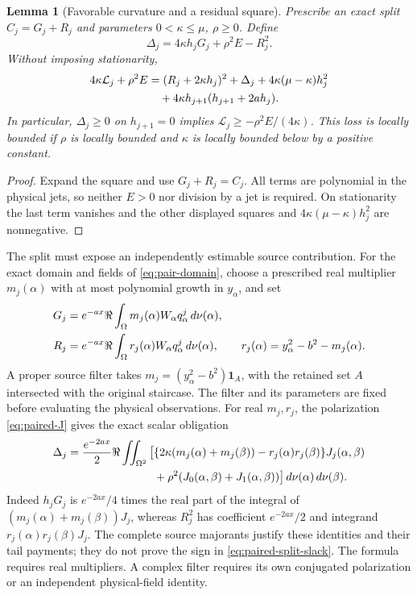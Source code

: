 \documentclass[11pt]{article}
\numberwithin{equation}{section}
\newtheorem{lemma}[theorem]{Lemma}
\theoremstyle{definition}
\theoremstyle{remark}
\newcommand{\dd}{\,d}
\newcommand{\Lag}{\mathcal L}
\begin{document}
\begin{lemma}[Favorable curvature and a residual square]
\label{lem:favorable-split}
Prescribe an exact split $C_j=G_j+R_j$ and parameters
$0<\kappa\le\mu$, $\rho\ge0$. Define
\begin{equation}
 \Delta_j=4\kappa h_jG_j+\rho^2E-R_j^2.
 \label{eq:split-slack}
\end{equation}
Without imposing stationarity,
\begin{align}
 4\kappa\Lag_j+\rho^2E
 &=(R_j+2\kappa h_j)^2+\Delta_j
       +4\kappa(\mu-\kappa)h_j^2 \notag\\
 &\quad+4\kappa h_{j+1}(h_{j+1}+2ah_j).
 \label{eq:split-stationary-ideal}
\end{align}
In particular, $\Delta_j\ge0$ on $h_{j+1}=0$ implies
$\Lag_j\ge-\rho^2E/(4\kappa)$. This loss is locally bounded if
$\rho$ is locally bounded and $\kappa$ is locally bounded below by a
positive constant.
\end{lemma}
\begin{proof}
Expand the square and use $G_j+R_j=C_j$. All terms are polynomial in
the physical jets, so neither $E>0$ nor division by a jet is required.
On stationarity the last term vanishes and the other displayed squares
and $4\kappa(\mu-\kappa)h_j^2$ are nonnegative.
\end{proof}

The split must expose an independently estimable source contribution.
For the exact domain and fields of \eqref{eq:pair-domain}, choose a
prescribed real multiplier $m_j(\alpha)$ with at most polynomial growth
in $y_\alpha$, and set
\begin{align}
 G_j&=e^{-ax}\Re\int_\Omega m_j(\alpha)W_\alpha q_\alpha^j\dd\nu(\alpha),
       \notag\\
 R_j&=e^{-ax}\Re\int_\Omega r_j(\alpha)W_\alpha q_\alpha^j\dd\nu(\alpha),
 \qquad r_j(\alpha)=y_\alpha^2-b^2-m_j(\alpha).
 \label{eq:prescribed-source-split}
\end{align}
A proper source filter takes
$m_j=(y_\alpha^2-b^2)\mathbf1_A$, with the retained set $A$ intersected
with the original staircase. The filter and its parameters are fixed
before evaluating the physical observations. For real $m_j,r_j$, the
polarization \eqref{eq:paired-J} gives the exact scalar obligation
\begin{align}
 \Delta_j=\frac{e^{-2ax}}2\Re\iint_{\Omega^2}
 \big[&\{2\kappa(m_j(\alpha)+m_j(\beta))
                  -r_j(\alpha)r_j(\beta)\}J_j(\alpha,\beta)\notag\\
       &+\rho^2(J_0(\alpha,\beta)+J_1(\alpha,\beta))\big]
       \dd\nu(\alpha)\dd\nu(\beta).
 \label{eq:paired-split-slack}
\end{align}
Indeed $h_jG_j$ is $e^{-2ax}/4$ times the real part of the integral
of $(m_j(\alpha)+m_j(\beta))J_j$, whereas $R_j^2$ has coefficient
$e^{-2ax}/2$ and integrand $r_j(\alpha)r_j(\beta)J_j$.
The complete source majorants justify these identities and their tail
payments; they do not prove the sign in \eqref{eq:paired-split-slack}.
The formula requires real multipliers. A complex filter requires its
own conjugated polarization or an independent physical-field identity.
\end{document}
